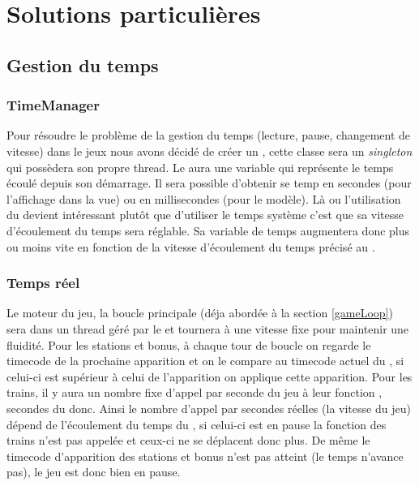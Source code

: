 \documentclass[report, backcover, french, nodocumentinfo]{upmethodology-document}
\begin{document}
	\chapter{Solutions particulières}
		\section{Gestion du temps}
			\subsection{TimeManager}
				Pour résoudre le problème de la gestion du temps (lecture, pause, changement de vitesse) dans le jeux nous avons décidé de créer un , cette classe sera un \textit{singleton} qui possèdera son propre thread. Le  aura une variable qui représente le temps écoulé depuis son démarrage. Il sera possible d'obtenir se temp en secondes (pour l'affichage dans la vue) ou en millisecondes (pour le modèle). Là ou l'utilisation du  devient intéressant plutôt que d'utiliser le temps système c'est que sa vitesse d'écoulement du temps sera réglable. Sa variable de temps augmentera donc plus ou moins vite en fonction de la vitesse d'écoulement du temps précisé au .
			\subsection{Temps réel}
				Le moteur du jeu, la boucle principale (déja abordée à la section \ref{gameLoop}) sera dans un thread géré par le  et tournera à une vitesse fixe pour maintenir une fluidité. Pour les stations et bonus, à chaque tour de boucle on regarde le timecode de la prochaine apparition et on le compare au timecode actuel du , si celui-ci est supérieur à celui de l'apparition on applique cette apparition. Pour les trains, il y aura un nombre fixe d'appel par seconde du jeu à leur fonction , secondes du  donc. Ainsi le nombre d'appel par secondes réelles (la vitesse du jeu) dépend de l'écoulement du temps du , si celui-ci est en pause la fonction  des trains n'est pas appelée et ceux-ci ne se déplacent donc plus. De même le timecode d'apparition des stations et bonus n'est pas atteint (le temps n'avance pas), le jeu est donc bien en pause.
\end{document}
